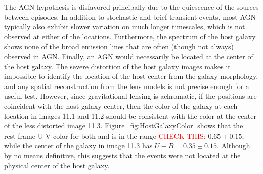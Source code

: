 The AGN hypothesis is disfavored principally due to the quiescence of
the \spock sources between episodes. In addition to stochastic and
brief transient events, most AGN typically also exhibit slower
variation on much longer timescales, which is not observed at either
of the \spock locations. Furthermore, the spectrum of the \spock host
galaxy shows none of the broad emission lines that are often (though
not always) observed in AGN.  Finally, an AGN would necessarily be
located at the center of the host galaxy. The severe distortion of the
host galaxy images makes it impossible to identify the location of the
host center from the galaxy morphology, and any spatial reconstruction
from the lens models is not precise enough for a useful test.
However, since gravitational lensing is achromatic, if the \spock
positions are coincident with the host galaxy center, then the color
of the galaxy at each \spock location in images 11.1 and 11.2 should
be consistent with the color at the center of the less distorted image
11.3.  Figure~\ref{fig:HostGalaxyColor} shows that the rest-frame U-V
color for both \spockone and \spocktwo is in the range
\textcolor{red}{CHECK THIS:} $0.65\pm0.15$, while the center of the
galaxy in image 11.3 has $U-B=0.35\pm0.15$. Although by no means
definitive, this suggests that the \spock events were not located at
the physical center of the host galaxy.

